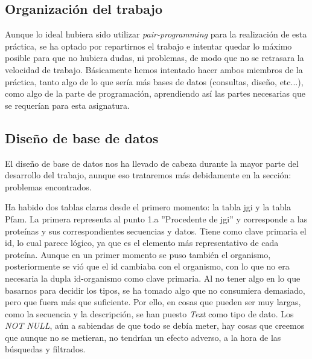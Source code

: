 \documentclass[11pt]{article} %
\begin{document}
\subsection{Organizaci\'on del trabajo}

Aunque lo ideal hubiera sido utilizar \emph{pair-programming} para la realizaci\'on de esta pr\'actica, se ha optado por repartirnos el trabajo e intentar quedar lo m\'aximo posible para que no hubiera dudas, ni problemas, de modo que no se retrasara la velocidad de trabajo. B\'asicamente hemos intentado hacer ambos miembros de la pr\'actica, tanto algo de lo que ser\'ia m\'as bases de datos (consultas, dise\~no, etc...), como algo de la parte de programaci\'on, aprendiendo as\'i las partes necesarias que se requer\'ian para esta asignatura.

\subsection{Dise\~no de base de datos}

El dise\~no de base de datos nos ha llevado de cabeza durante la mayor parte del desarrollo del trabajo, aunque eso trataremos m\'as debidamente en la secci\'on: problemas encontrados.

Ha habido dos tablas claras desde el primero momento: la tabla jgi y la tabla Pfam. La primera representa al punto 1.a ''Procedente de jgi'' y corresponde a las prote\'inas y sus correspondientes secuencias y datos. Tiene como clave primaria el id, lo cual parece l\'ogico, ya que es el elemento m\'as representativo de cada prote\'ina. Aunque en un primer momento se puso tambi\'en el organismo, posteriormente se vi\'o que el id cambiaba con el organismo, con lo que no era necesaria la dupla id-organismo como clave primaria. Al no tener algo en lo que basarnos para decidir los tipos, se ha tomado algo que no consumiera demasiado, pero que fuera m\'as que suficiente. Por ello, en cosas que pueden ser muy largas, como la secuencia y la descripci\'on, se han puesto \emph{Text} como tipo de dato. Los \emph{NOT NULL}, a\'un a sabiendas de que todo se deb\'ia meter, hay cosas que creemos que aunque no se metieran, no tendr\'ian un efecto adverso, a la hora de las b\'usquedas y filtrados.
\end{document}
